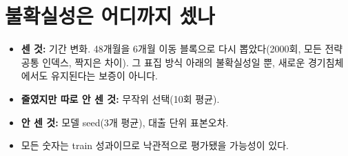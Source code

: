 \section{불확실성은 어디까지 셌나}
\begin{itemize}[leftmargin=*]
\item \textbf{센 것:} 기간 변화. 48개월을 6개월 이동 블록으로 다시 뽑았다(2000회, 모든 전략 공통 인덱스, 짝지은 차이). 그 표집 방식 아래의 불확실성일 뿐, 새로운 경기침체에서도 유지된다는 보증이 아니다.
\item \textbf{줄였지만 따로 안 센 것:} 무작위 선택(10회 평균).
\item \textbf{안 센 것:} 모델 seed(3개 평균), 대출 단위 표본오차.
\item 모든 숫자는 train 성과이므로 낙관적으로 평가됐을 가능성이 있다.
\end{itemize}
